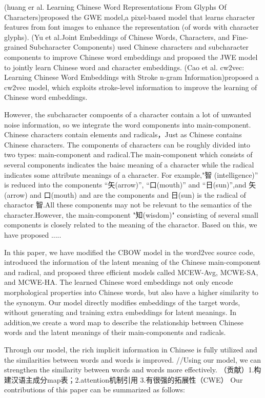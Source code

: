 \documentclass[runningheads]{llncs}
\begin{document}
\begin{CJK}{UTF8}{gkai}
(huang er al. Learning Chinese Word Representations From Glyphs Of Characters)proposed the GWE model,a pixel-based model that learns character features from font images to enhance the representation (of words with character glyphs).
(Yu et al.Joint Embeddings of Chinese Words, Characters, and Fine-grained Subcharacter Components) used Chinese characters and subcharacter components to improve Chinese word embeddings 
and proposed the JWE model to jointly learn Chinese word and character embeddings.
(Cao et al. cw2vec: Learning Chinese Word Embeddings with Stroke n-gram Information)proposed a cw2vec model, which exploits stroke-level information to improve the learning of Chinese word embeddings.


   However, the subcharacter compoents of a character contain a lot of unwanted noise information, so we integrate the word components into main-component.
Chinese characters contain elements and radicals，Just as Chinese contains Chinese characters.
The components of characters can be roughly divided into two types: main-component and radical.The main-component which consists of several components indicates the baisc meaning of a character while the radical indicates some attribute meanings of a character.
For example,"智 (intelligence)” is reduced into the components “矢(arrow)”, “口(mouth)” and “日(sun)”,and 矢(arrow) and 口(mouth) and are the components and 日(sun) is the radical of charactor 智.All these components may not be relevant to the semantics of the character.However, the main-component "知(wisdom)" consisting of several small components is closely related to the meaning of the charactor. Based on this, we have proposed .....

    In this paper, we have modified the CBOW model in the word2vec source code, introduced the information of the latent meaning of the Chinese main-component and radical, 
and proposed three efficient models called MCEW-Avg, MCWE-SA, and MCWE-HA.
   The learned Chinese word embeddings not only encode morphological properties into Chinese words, but also have a higher similarity to the synonym.
   Our model directly modifies embeddings of the target words, without generating and training extra embeddings for latent meanings.
In addition,we create a word map to describe the relationship between Chinese words and the latent meanings of their main-components and radicals.


Through our model, the rich implicit information in Chinese is fully utilized and the similarities between words and words is improved.
//Using our model, we can strengthen the similarity between words and words more effectively.
（贡献）1.构建汉语主成分map表；2.attention机制引用 3.有很强的拓展性（CWE）
Our contributions of this paper can be summarized as follows:


\end{CJK}
\end{document}
